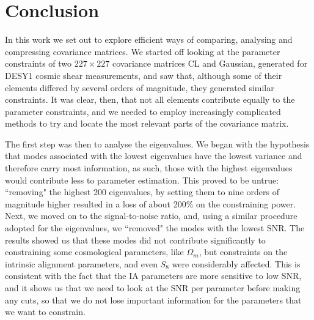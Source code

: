 \documentclass[twocolumn]{\docclass}
\begin{document}
	
	\section{Conclusion}
	\label{sec:conclusion}
	
	In this work we set out to explore efficient ways of comparing, analysing and compressing covariance matrices. We started off looking at the parameter constraints of two $227 \times 227$ covariance matrices CL and Gaussian, generated for DESY1 cosmic shear measurements, and saw that, although some of their elements differed by several orders of magnitude, they generated similar constraints. It was clear, then, that not all elements contribute equally to the parameter constraints, and we needed to employ increasingly complicated methods to try and locate the most relevant parts of the covariance matrix.
	
	The first step was then to analyse the eigenvalues. We began with the hypothesis that modes associated with the lowest eigenvalues have the lowest variance and therefore carry most information, as such, those with the highest eigenvalues would contribute less to parameter estimation. This proved to be untrue: ``removing" the highest 200 eigenvalues, by setting them to nine orders of magnitude higher resulted in a loss of about 200\% on the constraining power. Next, we moved on to the signal-to-noise ratio, and, using a similar procedure adopted for the eigenvalues, we ``removed" the modes with the lowest SNR. The results showed us that these modes did not contribute significantly to constraining some cosmological parameters, like $\Omega_m$, but constraints on the intrinsic alignment parameters, and even $S_8$ were considerably affected. This is consistent with the fact that the IA parameters are more sensitive to low SNR, and it shows us that we need to look at the SNR per parameter before making any cuts, so that we do not lose important information for the parameters that we want to constrain.
	
\end{document}
